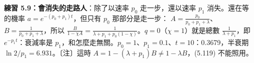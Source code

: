 \begin{table}[htbp]
\centering
\FiveTabCTRW
\caption{連續時間漫步。上：$t=3$ 走了 $m$ 步的機率；下：一維格子上的分布與高斯極限}\label{five-tab-ctrw}
\end{table}

\textbf{練習 5.9：會消失的走路人}：除了以速率 $p_0$ 走一步，還以速率 $p_1$ 消失。還在等的機率 $a=e^{-(p_0+p_1)t}$，但只有 $p_0$ 那部分是走一步：
$A=\frac{p_0}{p_0+p_1+\lambda}$、$B=\frac{1}{p_0+p_1+\lambda}$，所以 $\frac{B}{1-\chi A}=\frac{1}{\lambda+p_1+p_0(1-\chi)}$。$q=0$（$\chi=1$）就是總數 $\frac1{\lambda+p_1}$，即 $e^{-p_1t}$：衰減率是 $p_1$，和怎麼走無關。$p_0=1$、$p_1=0.1$、$t=10$：0.3679，半衰期 $\ln2/p_1=6.931$。〔注〕這時 $A=1-(\lambda+p_1)B\ne1-\lambda B$，(5.119) 不能照用。

